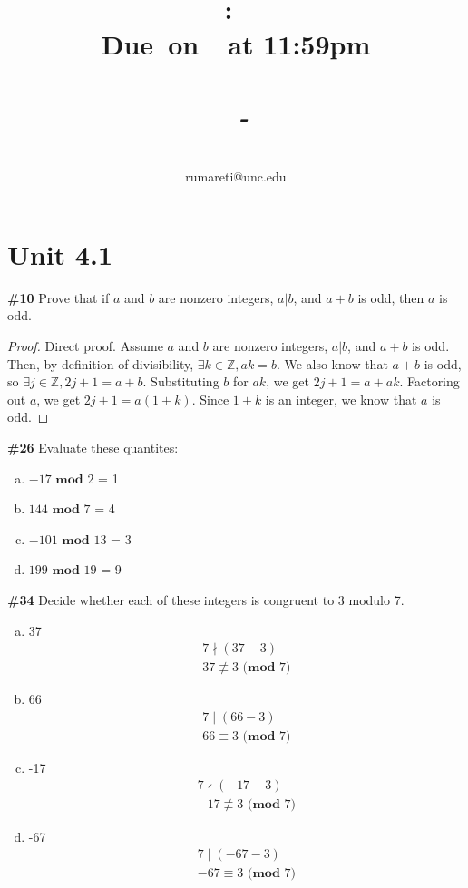 \documentclass{article}
\title{
    \vspace{2in}
    \textmd{\textbf{\hmwkClass:\ \hmwkTitle}}\\
    \normalsize\vspace{0.1in}\small{\textbf{Due\ on\ \hmwkDueDate\ at 11:59pm}}\\
    \normalsize\text{Tuesday/Thursday 11:00-12:15, Phillips 383}\\
    \vspace{0.1in}\large{\textit{\hmwkClassInstructor\ - \hmwkClassTime}}
    \vspace{3in}
}
\author{\hmwkAuthorName\\\small{rumareti@unc.edu}}
\date{}
\newcommand{\unit}[1]{\section{Unit #1}}
\newcommand{\problem}[1]{\textbf{\##1}}
\newcommand{\prob}[1]{\problem{#1}}
\newcommand{\AllIntegers}{\mathbb{Z}}
\renewcommand{\pmod}[1]{\textbf{ (mod }#1)}
\begin{document}
\maketitle

\pagebreak

\unit{4.1}
\prob{10}
Prove that if \(a\) and \(b\) are nonzero integers, \(a | b\), and \(a + b\) is odd, then \(a\) is odd.
\begin{proof}
    Direct proof. Assume \(a\) and \(b\) are nonzero integers, \(a | b\), and \(a + b\) is odd. Then, by definition of divisibility, \(\exists k \in \AllIntegers, ak = b\). We also know that \(a + b\) is odd, so \(\exists j \in \AllIntegers, 2j + 1 = a + b\). Substituting \(b\) for \(ak\), we get \(2j + 1 = a + ak\). Factoring out \(a\), we get \(2j + 1 = a(1 + k)\). Since \(1 + k\) is an integer, we know that \(a\) is odd.
\end{proof}
\pagebreak
\prob{26}
Evaluate these quantites:
\begin{enumerate}[a)]
    \item \(-17 \textbf{ mod } 2\) = \hspace{12pt} 1
    \item \(144 \textbf{ mod } 7\) = \hspace{14pt} 4
    \item \(-101 \textbf{ mod } 13\) = \hspace{5pt}3
    \item \(199 \textbf{ mod } 19\) = \hspace{9pt} 9
\end{enumerate}
\pagebreak
\prob{34}
Decide whether each of these integers is congruent to 3 modulo 7.
\begin{enumerate}[a)]
    \item 37
    \begin{align*}
        7 \nmid (37 - 3)\\
        37 \not\equiv 3 \pmod{7}
    \end{align*}
    \item 66
    \begin{align*}
        7 \mid (66 - 3)\\
        66 \equiv 3 \pmod{7}
    \end{align*}
    \item -17
    \begin{align*}
        7 \nmid (-17 - 3)\\
        -17 \not\equiv 3 \pmod{7}
    \end{align*}
    \item -67
    \begin{align*}
        7 \mid (-67 - 3)\\
        -67 \equiv 3 \pmod{7}
    \end{align*}
\end{enumerate}
\end{document}
